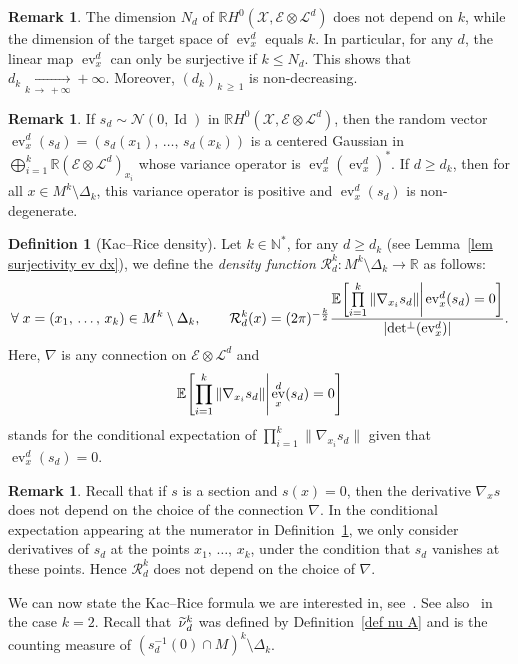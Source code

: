 \documentclass[10pt]{amsart}
\theoremstyle{definition}\newtheorem{defi}[theo]{Definition}\newtheorem{rema}[theo]{Remark}\newtheorem{exam}[theo]{Example}\newtheorem{exem}[theo]{Example}\newtheorem{nota}[theo]{Notation}
\DeclareMathOperator{\ev}{ev}
\DeclareMathOperator{\Id}{Id}
\newcommand{\E}{\mathcal{E}}
\newcommand{\X}{\mathcal{X}}
\renewcommand{\L}{\mathcal{L}}
\newcommand{\clN}{\mathcal{N}}
\newcommand{\clR}{\mathcal{R}}
\newcommand{\N}{\mathbb{N}}
\newcommand{\R}{\mathbb{R}}
\newcommand{\espcond}[3][]{\mathbb{E}_{#1}\!\left[#2\hspace{-1mm} \mvert \! #3 \right]}
\newcommand{\odet}[1]{\norm{\det\! ^\perp\!\left(#1\right)}}
\newcommand{\mvert}{\mathrel{}\middle|\mathrel{}}
\newcommand{\norm}[1]{\left\lvert #1 \right\rvert}
\newcommand{\Norm}[1]{\left\lVert #1 \right\rVert}
\renewcommand{\H}{H^0(\X,\E \otimes \L^d)}
\renewcommand{\geq}{\geqslant}
\renewcommand{\leq}{\leqslant}
\renewcommand{\tilde}{\widetilde}
\let\oldtilde\tilde
\renewcommand*{\tilde}[1]{\mathchoice{\widetilde{#1}}{\widetilde{#1}}{\oldtilde{#1}}{\oldtilde{#1}}}
\let\oldforall\forall
\renewcommand*{\forall}{\mathrel{\oldforall}}
\begin{document}
\begin{rema}\label{rem dk to infinity}
The dimension $N_d$ of $\R\H$ does not depend on $k$, while the dimension of the target space of $\ev^d_x$ equals $k$. In particular, for any $d$, the linear map $\ev_x^d$ can only be surjective if $k \leq N_d$. This shows that $d_k \xrightarrow[k\, \to\,+\infty]{} +\infty$. Moreover, $(d_k)_{k\,\geq\,1}$ is non-decreasing.
\end{rema}

\begin{rema}\label{rem non degeneracy}
If $s_d \sim \clN(0,\Id)$ in $\R\H$, then the random vector $\ev^d_x(s_d) = (s_d(x_1),\,\dots,\,s_d(x_k))$ is a centered Gaussian in $\bigoplus_{i=1}^k \R(\E \otimes \L^d)_{x_i}$ whose variance operator is $\ev^d_x (\ev^d_x)^*$. If $d \geq d_k$, then for all $x \in M^k \setminus \Delta_k$, this variance operator is positive and $\ev^d_x(s_d)$ is non-degenerate.
\end{rema}

\begin{defi}[Kac--Rice density]\label{def Rkd}
Let $k \in \N^*$, for any $d \geq d_k$ (see Lemma~\ref{lem surjectivity ev dx}), we define the \emph{density function} $\clR^k_d:M^k \setminus \Delta_k \to \R$ as follows:
\[
\forall x=(x_1,\,\dots,\,x_k) \in M^k \setminus \Delta_k, \qquad \clR^k_d(x) = (2\pi)^{-\frac{k}{2}}\frac{\espcond{\prod\limits_{i=1}^k \Norm{\nabla_{x_i} s_d}}{\ev_x^d(s_d)=0}}{\odet{\ev^d_x}}.
\]
Here, $\nabla$ is any connection on $\E \otimes \L^d$ and
\[
\espcond{\prod_{i=1}^k \left\|\nabla_{x_i} s_d\right\|}{\ev_x^d(s_d)=0}
\] stands for the conditional expectation of $\prod_{i=1}^k \|\nabla_{x_i} s_d\|$ given that $\ev_x^d(s_d)=0$.
\end{defi}

\begin{rema}\label{rem choice of nabla}
Recall that if $s$ is a section and $s(x)=0$, then the derivative $\nabla_x s$ does not depend on the choice of the connection $\nabla$. In the conditional expectation appearing at the numerator in Definition~\ref{def Rkd}, we only consider derivatives of $s_d$ at the points $x_1,\,\dots,\,x_k$, under the condition that $s_d$ vanishes at these points. Hence $\clR^k_d$ does not depend on the choice of $\nabla$.
\end{rema}

We can now state the Kac--Rice formula we are interested in, see~\cite[Propositions~2.5 and~2.9]{Anc2019}. See also~\cite[Theorem~5.5]{LP2019} in the case $k=2$. Recall that~$\tilde{\nu}_d^k$ was defined by Definition~\ref{def nu A} and is the counting measure of $(s_d^{-1}(0) \cap M)^k \setminus \Delta_k$.
\end{document}
